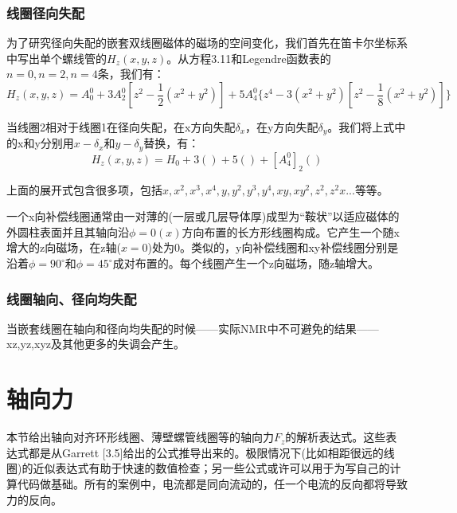 \subsubsection{线圈径向失配}
为了研究径向失配的嵌套双线圈磁体的磁场的空间变化，我们首先在笛卡尔坐标系中写出单个螺线管的$H_z(x,y,z)$。从方程3.11和Legendre函数表的$n=0,n=2,n=4$条，我们有：
\begin{equation}
  H_z(x,y,z)=A_0^0+3A_2^0[z^2-\frac{1}{2}(x^2+y^2)]+5A_4^0\{z^4-3(x^2+y^2)[z^2-\frac{1}{8}(x^2+y^2)]\}
\end{equation}

当线圈2相对于线圈1在径向失配，在x方向失配$\delta_x$，在y方向失配$\delta_y$。我们将上式中的x和y分别用$x-\delta_x$和$y-\delta_y$替换，有：
$$
H_z(x,y,z)=H_0+3()+5()+[A_4^0]_2()
$$

上面的展开式包含很多项，包括$x,x^2,x^3,x^4,y,y^2,y^3,y^4,xy,xy^2,z^2,z^2x...$等等。

一个x向补偿线圈通常由一对薄的(一层或几层导体厚)成型为“鞍状”以适应磁体的外圆柱表面并且其轴向沿$\phi=0(x)$方向布置的长方形线圈构成。它产生一个随x增大的z向磁场，在z轴($x=0$)处为0。类似的，y向补偿线圈和xy补偿线圈分别是沿着$\phi=90^\circ$和$\phi=45^\circ$成对布置的。每个线圈产生一个z向磁场，随z轴增大。

\subsubsection{线圈轴向、径向均失配}
当嵌套线圈在轴向和径向均失配的时候——实际NMR中不可避免的结果——xz,yz,xyz及其他更多的失调会产生。

\section{轴向力}
本节给出轴向对齐环形线圈、薄壁螺管线圈等的轴向力$F_z$的解析表达式。这些表达式都是从Garrett [3.5]给出的公式推导出来的。极限情况下(比如相距很远的线圈)的近似表达式有助于快速的数值检查；另一些公式或许可以用于为写自己的计算代码做基础。所有的案例中，电流都是同向流动的，任一个电流的反向都将导致力的反向。

